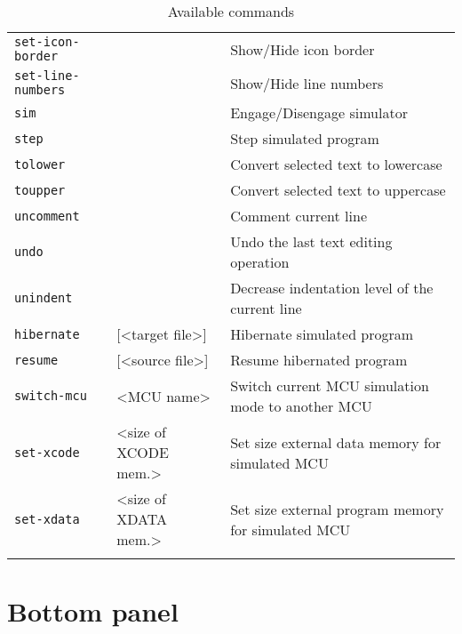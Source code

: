\documentclass[a4paper,twoside,12pt]{book}
\begin{document}
{\begin{longtable}{l|ll}
				\texttt{set-icon-border}&			& Show/Hide icon border					\\
				\texttt{set-line-numbers}&			& Show/Hide line numbers				\\
				\texttt{sim}		&			& Engage/Disengage simulator				\\
				\texttt{step}		&			& Step simulated program				\\
				\texttt{tolower}	&			& Convert selected text to lowercase			\\
				\texttt{toupper}	&			& Convert selected text to uppercase			\\
				\texttt{uncomment}	&			& Comment current line					\\
				\texttt{undo}		&			& Undo the last text editing operation			\\
				\texttt{unindent}	&			& Decrease indentation level of the current line	\\
				\texttt{hibernate}	& [<target file>]	& Hibernate simulated program				\\
				\texttt{resume}		& [<source file>]	& Resume hibernated program				\\
				\texttt{switch-mcu}	& <MCU name>		& Switch current MCU simulation mode to another MCU	\\
				\texttt{set-xcode}	& <size of XCODE mem.>	& Set size external data memory for simulated MCU	\\
				\texttt{set-xdata}	& <size of XDATA mem.>	& Set size external program memory for simulated MCU	\\
				\caption{Available commands}
			\end{longtable}
			}

	\section{Bottom panel}
\end{document}
